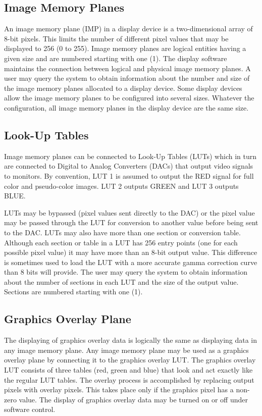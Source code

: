 \subsection{Image Memory Planes}
An image memory plane (IMP) in a display device is a two-dimensional
array of 8-bit pixels.  This limits the number of different pixel
values that may be displayed to 256 (0 to 255).  Image memory planes
are logical entities having a given size and are numbered starting
with one (1).  The display software maintains the connection between
logical and physical image memory planes.  A user may query the
system to obtain information about the number and size of the image
memory planes allocated to a display device.  Some display devices
allow the image memory planes to be configured into several sizes.
Whatever the configuration, all image memory planes in the display
device are the same size.
\subsection{Look-Up Tables}
Image memory planes can be connected to Look-Up Tables (LUTs) which
in turn are connected to Digital to Analog Converters (DACs) that
output video signals to monitors.  By convention, LUT 1 is assumed to
output the RED signal for full color and pseudo-color images.  LUT 2
outputs GREEN and LUT 3 outputs BLUE.

LUTs may be bypassed (pixel values sent directly to the DAC) or the
pixel value may be passed through the LUT for conversion to another value
before being sent to the DAC.  LUTs may also have more than one
section or conversion table.  Although each section or table in a LUT
has 256 entry points (one for each possible pixel value) it may have
more than an 8-bit output value.  This difference is sometimes used
to load the LUT with a more accurate gamma correction curve than 8
bits will provide.  The user may query the system to obtain
information about the number of sections in each LUT and the size of
the output value.  Sections are numbered starting with one (1).
\subsection{Graphics Overlay Plane}
The displaying of graphics overlay data is logically the same as
displaying data in any image memory plane.  Any image memory plane
may be used as a graphics overlay plane by connecting it to the
graphics overlay LUT.  The graphics overlay LUT consists of three
tables (red, green and blue) that look and act exactly like the
regular LUT tables.  The overlay process is accomplished by replacing
output pixels with overlay pixels.  This takes place only if the
graphics pixel has a non-zero value.  The display of graphics overlay
data may be turned on or off under software control.
